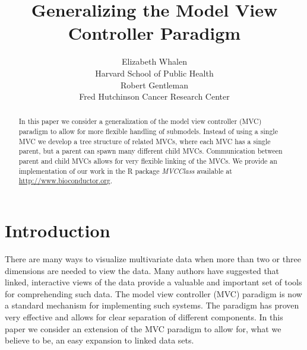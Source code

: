 \documentclass[11pt]{article}
\newcommand{\Rpackage}[1]{{\textit{#1}}}
\begin{document}


\author{Elizabeth Whalen\\Harvard School of Public Health \\ 
        Robert Gentleman\\Fred Hutchinson Cancer Research Center}
\title{Generalizing the Model View Controller Paradigm}

\maketitle

\begin{abstract} 
In this paper we consider a generalization of the model
  view controller (MVC) paradigm to allow for more flexible handling
  of submodels. Instead of using a single MVC we develop a tree
  structure of related MVCs, where each MVC has a single parent, but a
  parent can spawn many different child MVCs. Communication between
  parent and child MVCs allows for very flexible linking of the
  MVCs. We provide an implementation of our work in the R package
\Rpackage{MVCClass} available at \url{http://www.bioconductor.org}. 
\end{abstract}


\section{Introduction}
\label{Sec:Intro}



There are many ways to visualize multivariate data when more than
two or three dimensions are needed to view the data.  Many authors
\citep{intGrUnwin, iPlots, MONDRIAN, GGobi}
have suggested that linked, interactive views of the data
provide a valuable and important set of tools for comprehending such
data.  The model view controller (MVC) paradigm is now a standard
mechanism for implementing such systems.  The paradigm has proven very
effective and allows for clear separation of different components.
In this paper we consider an extension of the MVC paradigm to allow
for, what we believe to be, an easy expansion to linked data sets.
\end{document}
